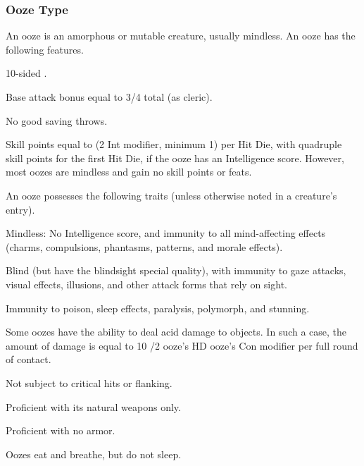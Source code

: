 {\subsubsection{Ooze Type} An ooze is an amorphous or mutable creature, usually mindless.
 An ooze has the following features.
\begin{itemize*}
\item 10-sided .
\item Base attack bonus equal to 3/4 total  (as cleric).
\item No good saving throws.
\item Skill points equal to (2 \add Int modifier, minimum 1) per Hit Die, with quadruple skill points for the first Hit Die, if the ooze has an Intelligence score. However, most oozes are mindless and gain no skill points or feats.
\end{itemize*}
 An ooze possesses the following traits (unless otherwise noted in a creature's entry).
\begin{itemize*}
\item Mindless: No Intelligence score, and immunity to all mind-affecting effects (charms, compulsions, phantasms, patterns, and morale effects).
\item Blind (but have the blindsight special quality), with immunity to gaze attacks, visual effects, illusions, and other attack forms that rely on sight.
\item Immunity to poison, sleep effects, paralysis, polymorph, and stunning.
\item Some oozes have the ability to deal acid damage to objects. In such a case, the amount of damage is equal to 10 /2 ooze's HD \add ooze's Con modifier per full round of contact.
\item Not subject to critical hits or flanking.
\item Proficient with its natural weapons only.
\item Proficient with no armor.
\item Oozes eat and breathe, but do not sleep.
\end{itemize*}

}
